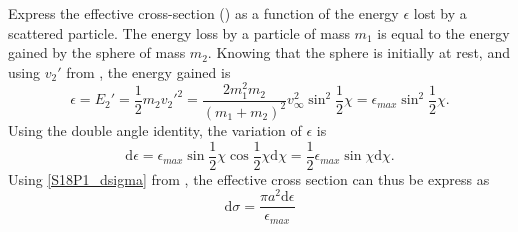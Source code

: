 
\begin{problem}[title={Rigid-sphere cross-section vs. energy loss}]
{
Express the effective cross-section () as a function of the energy $\epsilon$ lost by a scattered particle.
}
{
The energy loss by a particle of mass $m_1$ is equal to the energy gained by the sphere of mass $m_2$. Knowing that the sphere is initially at rest, and using $v_2'$ from , the energy gained is
\begin{equation*}
    \epsilon = E_2' = \frac{1}{2} m_2 v_2'^2 = \frac{2 m_1^2 m_2}{\left( m_1+m_2 \right)^2} v_\infty^2\sin^2{\frac{1}{2}\chi} = \epsilon_{max} \sin^2{\frac{1}{2}\chi}.
\end{equation*}
Using the double angle identity, the variation of $\epsilon$ is
\begin{equation*}
    \mathrm{d}\epsilon = \epsilon_{max}\sin{\frac{1}{2}\chi}\cos{\frac{1}{2}\chi}\mathrm{d}\chi = \frac{1}{2}\epsilon_{max}\sin{\chi}\mathrm{d}\chi.
\end{equation*}
Using \eqref{S18P1_dsigma} from , the effective cross section can thus be express as
}
{
\begin{equation*}
    \mathrm{d}\sigma = \frac{\pi a^2 \mathrm{d}\epsilon}{\epsilon_{max}}
\end{equation*}
}
\end{problem}


